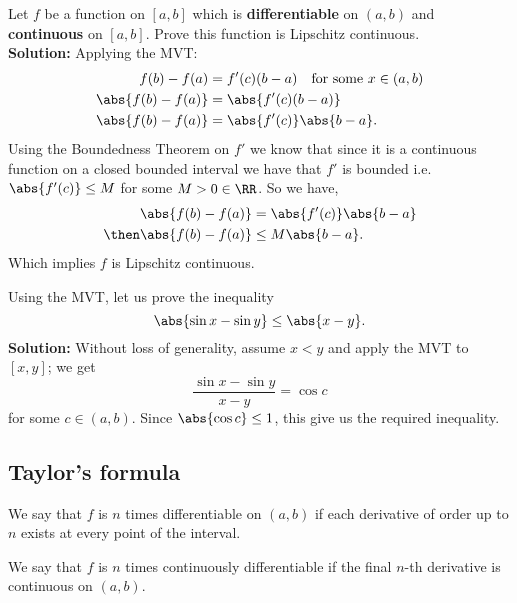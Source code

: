 \documentclass[12pt, a4paper]{article}
\begin{document}
\begin{mdexample}
    Let \(f\) be a function on \([a,b]\) which is \textbf{differentiable} on \((a,b)\) and \textbf{continuous} on \([a,b]\). Prove this function is Lipschitz continuous. \\
    \textbf{Solution:} Applying the MVT:
    \[\begin{aligned}
        f(b)-f(a) &= f'(c)(b-a) \quad \text{for some } x\in(a,b) \\
        \abs{f(b)-f(a)} &=\abs{f'(c)(b-a)} \\
        \abs{f(b)-f(a)} &=\abs{f'(c)}\abs{b-a}. \\
    \end{aligned}\]
    Using the Boundedness Theorem on \(f'\) we know that since it is a continuous function on a closed bounded interval we have that \(f'\) is bounded i.e. \(\abs{f'(c)}\leq M\) for some \(M >0\in \RR\). So we have,
    \[\begin{aligned}
        \abs{f(b)-f(a)} &=\abs{f'(c)}\abs{b-a} \\
        \then \abs{f(b)-f(a)} &\leq M\abs{b-a}.
    \end{aligned}\]
    Which implies \(f\) is Lipschitz continuous.
\end{mdexample}

\begin{example}
    Using the MVT, let us prove the inequality
    \[\abs{\sin x -\sin y} \leq \abs{x-y}.\]
    \textbf{Solution:} Without loss of generality, assume \(x<y\) and apply the MVT to \([x,y]\); we get 
    \[\frac{\sin x -\sin y}{x-y} =\cos c\]
    for some \(c\in (a,b)\). Since \(\abs{\cos c} \leq 1\), this give us the required inequality.
\end{example}

\subsection{Taylor's formula}

\begin{definition}
    We say that \(f\) is \(n\) times differentiable on \((a,b)\) if each derivative of order up to \(n\) exists at every point of the interval.
\end{definition}

\begin{definition}
    We say that \(f\) is \(n\) times continuously differentiable if the final \(n\)-th derivative is continuous on \((a,b)\).
\end{definition}
\end{document}
